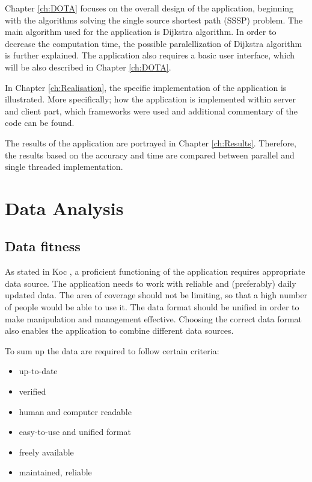 \documentclass[thesis=M,english]{FITthesis}[2012/10/20]
\begin{document}
Chapter \ref{ch:DOTA} focuses on the overall design of the application, beginning with the algorithms solving the single source shortest path (SSSP) problem. The main algorithm used for the application is Dijkstra algorithm. In order to decrease the computation time, the possible paralellization of Dijkstra algorithm is further explained. The application also requires a basic user interface, which will be also described in Chapter \ref{ch:DOTA}.

In Chapter \ref{ch:Realisation}, the specific implementation of the application is illustrated. More specifically; how the application is implemented within server and client part, which frameworks were used and additional commentary of the code can be found. 

The results of the application are portrayed in Chapter \ref{ch:Results}. Therefore, the results based on the accuracy and time are compared between parallel and single threaded implementation.


\chapter{Data Analysis}
\label{ch:DA}

\section{Data fitness}
\label{S1: Good data}
As stated in Koc \cite{Koc14}, a proficient functioning of the application requires appropriate data source. The application needs to work with reliable and (preferably) daily updated data. The area of coverage should not be limiting, so that a high number of people would be able to use it. The data format should be unified in order to make manipulation and management effective. Choosing the correct data format also enables the application to combine different data sources.

To sum up the data are required to follow certain criteria:
\begin{itemize}
	\item up-to-date
	\item verified
	\item human and computer readable
	\item easy-to-use and unified format
	\item freely available
	\item maintained, reliable
\end{itemize}
\end{document}
